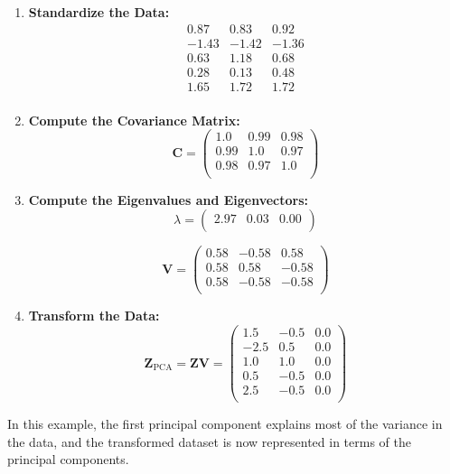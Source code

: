 \documentclass{article}
\begin{document}
\begin{enumerate}
    \item \textbf{Standardize the Data:}
    \[
    \begin{array}{ccc}
    0.87 & 0.83 & 0.92 \\
    -1.43 & -1.42 & -1.36 \\
    0.63 & 1.18 & 0.68 \\
    0.28 & 0.13 & 0.48 \\
    1.65 & 1.72 & 1.72 \\
    \end{array}
    \]

    \item \textbf{Compute the Covariance Matrix:}
    \[
    \mathbf{C} = \begin{pmatrix}
    1.0 & 0.99 & 0.98 \\
    0.99 & 1.0 & 0.97 \\
    0.98 & 0.97 & 1.0 \\
    \end{pmatrix}
    \]

    \item \textbf{Compute the Eigenvalues and Eigenvectors:}
    \[
    \lambda = \begin{pmatrix}
    2.97 & 0.03 & 0.00 \\
    \end{pmatrix}
    \]

    \[
    \mathbf{V} = \begin{pmatrix}
    0.58 & -0.58 & 0.58 \\
    0.58 & 0.58 & -0.58 \\
    0.58 & -0.58 & -0.58 \\
    \end{pmatrix}
    \]

    \item \textbf{Transform the Data:}
    \[
    \mathbf{Z}_{\text{PCA}} = \mathbf{Z} \mathbf{V} = \begin{pmatrix}
    1.5 & -0.5 & 0.0 \\
    -2.5 & 0.5 & 0.0 \\
    1.0 & 1.0 & 0.0 \\
    0.5 & -0.5 & 0.0 \\
    2.5 & -0.5 & 0.0 \\
    \end{pmatrix}
    \]

\end{enumerate}

In this example, the first principal component explains most of the variance in the data, and the transformed dataset is now represented in terms of the principal components.
\end{document}
